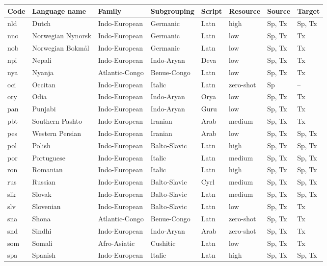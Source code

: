 \begin{table}[!p]
\centering
\scriptsize
\begin{tabular}{llllllll}
\toprule
\textbf{Code} & \textbf{Language name} & \textbf{Family} & \textbf{Subgrouping} & \textbf{Script} & \textbf{Resource} & \textbf{Source} & \textbf{Target} \\
\midrule
nld & Dutch & Indo-European & Germanic & Latn & high & Sp, Tx & Sp, Tx \\
nno & Norwegian Nynorsk & Indo-European & Germanic & Latn & low & Sp, Tx & Tx \\
nob & Norwegian Bokmål & Indo-European & Germanic & Latn & low & Sp, Tx & Tx \\
npi & Nepali & Indo-European & Indo-Aryan & Deva & low & Sp, Tx & Tx \\
nya & Nyanja & Atlantic-Congo & Benue-Congo & Latn & low & Sp, Tx & Tx \\
oci & Occitan & Indo-European & Italic & Latn & zero-shot & Sp & -- \\
ory & Odia & Indo-European & Indo-Aryan & Orya & low & Sp, Tx & Tx \\
pan & Punjabi & Indo-European & Indo-Aryan & Guru & low & Sp, Tx & Tx \\
pbt & Southern Pashto & Indo-European & Iranian & Arab & medium & Sp, Tx & Tx \\
pes & Western Persian & Indo-European & Iranian & Arab & low & Sp, Tx & Sp, Tx \\
pol & Polish & Indo-European & Balto-Slavic & Latn & high & Sp, Tx & Sp, Tx \\
por & Portuguese & Indo-European & Italic & Latn & medium & Sp, Tx & Sp, Tx \\
ron & Romanian & Indo-European & Italic & Latn & high & Sp, Tx & Sp, Tx \\
rus & Russian & Indo-European & Balto-Slavic & Cyrl & medium & Sp, Tx & Sp, Tx \\
slk & Slovak & Indo-European & Balto-Slavic & Latn & medium & Sp, Tx & Sp, Tx \\
slv & Slovenian & Indo-European & Balto-Slavic & Latn & low & Sp, Tx & Tx \\
sna & Shona & Atlantic-Congo & Benue-Congo & Latn & zero-shot & Sp, Tx & Tx \\
snd & Sindhi & Indo-European & Indo-Aryan & Arab & zero-shot & Sp, Tx & Tx \\
som & Somali & Afro-Asiatic & Cushitic & Latn & low & Sp, Tx & Tx \\
spa & Spanish & Indo-European & Italic & Latn & high & Sp, Tx & Sp, Tx \\

\end{tabular}
\end{table}

